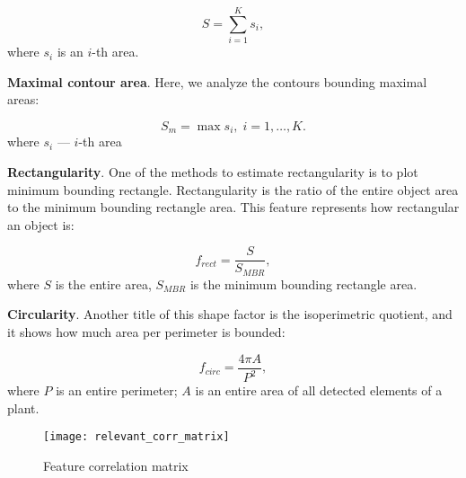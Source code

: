 \begin{equation}
	\label{eq:4}
	 S = \sum_{i=1}^{K}s_i,
\end{equation}
where $s_i$ is an $i$-th area.

\vspace{1cm}

\textbf{Maximal contour area}. Here, we analyze the contours bounding maximal areas:

\begin{equation}
	\label{eq:5}
	 S_m = \max{s_i}, \; i = 1, \dots, K.
\end{equation}
where $s_i$ –– $i$-th area

\vspace{1cm}

\textbf{Rectangularity}. One of the methods to estimate rectangularity is to plot minimum bounding rectangle. Rectangularity is the ratio of the entire object area to the minimum bounding rectangle area. This feature represents how rectangular an object is:

\begin{equation}
	f_{rect} = \frac{S}{S_{MBR}},
	\label{eq:6}
\end{equation}
where $S$ is the entire area, $S_{MBR}$ is the minimum bounding rectangle area.

\vspace{1cm}

\textbf{Circularity}. Another title of this shape factor is the isoperimetric quotient, and it shows how much area per perimeter is bounded:

\begin{equation}
	f_{circ} = \frac{4 \pi A}{P^2},
	\label{eq:7}
\end{equation}
where $P$ is an entire perimeter; $A$ is an entire area of all detected elements of a plant.


\begin{figure}[h]
	\centering
	\texttt{[image: relevant\_corr\_matrix]}
	\caption{Feature correlation matrix}
	\label{fig_corr_matrix}
\end{figure}


